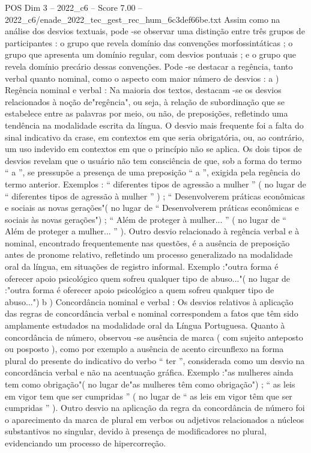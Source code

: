 \begin{textsample}{POS Dim 3 – 2022\_c6 – Score 7.00 – 2022\_c6/enade\_2022\_tec\_gest\_rec\_hum\_6c3def66be.txt}
Assim como na análise dos desvios textuais, pode -se observar uma distinção entre três grupos de participantes : o grupo que revela domínio das convenções morfossintáticas ; o grupo que apresenta um domínio regular, com desvios pontuais ; e o grupo que revela domínio precário dessas convenções.
Pode -se destacar a regência, tanto verbal quanto nominal, como o aspecto com maior número de desvios : a ) Regência nominal e verbal : Na maioria dos textos, destacam -se os desvios relacionados à noção de"regência", ou seja, à relação de subordinação que se estabelece entre as palavras por meio, ou não, de preposições, refletindo uma tendência na modalidade escrita da língua.
O desvio mais frequente foi a falta do sinal indicativo da crase, em contextos em que seria obrigatória, ou, ao contrário, um uso indevido em contextos em que o princípio não se aplica.
Os dois tipos de desvios revelam que o usuário não tem consciência de que, sob a forma do termo “ a ”, se pressupõe a presença de uma preposição “ a ”, exigida pela regência do termo anterior.
Exemplos : “ diferentes tipos de agressão a mulher ” ( no lugar de “ diferentes tipos de agressão à mulher ” ) ; “ Desenvolverem práticas econômicas e sociais as novas gerações"( no lugar de “ Desenvolverem práticas econômicas e sociais às novas gerações") ; “ Além de proteger à mulher... ” ( no lugar de “ Além de proteger a mulher... ” ).
Outro desvio relacionado à regência verbal e à nominal, encontrado frequentemente nas questões, é a ausência de preposição antes de pronome relativo, refletindo um processo generalizado na modalidade oral da língua, em situações de registro informal.
Exemplo :"outra forma é oferecer apoio psicológico quem sofreu qualquer tipo de abuso..."( no lugar de :"outra forma é oferecer apoio psicológico a quem sofreu qualquer tipo de abuso...") b ) Concordância nominal e verbal : Os desvios relativos à aplicação das regras de concordância verbal e nominal correspondem a fatos que têm sido amplamente estudados na modalidade oral da Língua Portuguesa.
Quanto à concordância de número, observou -se ausência de marca ( com sujeito anteposto ou posposto ), como por exemplo a ausência de acento circunflexo na forma plural do presente do indicativo do verbo “ ter ”, considerada como um desvio na concordância verbal e não na acentuação gráfica.
Exemplo :"as mulheres ainda tem como obrigação"( no lugar de"as mulheres têm como obrigação") ; “ as leis em vigor tem que ser cumpridas ” ( no lugar de “ as leis em vigor têm que ser cumpridas ” ).
Outro desvio na aplicação da regra da concordância de número foi o aparecimento da marca de plural em verbos ou adjetivos relacionados a núcleos substantivos no singular, devido à presença de modificadores no plural, evidenciando um processo de hipercorreção.

\end{textsample}
